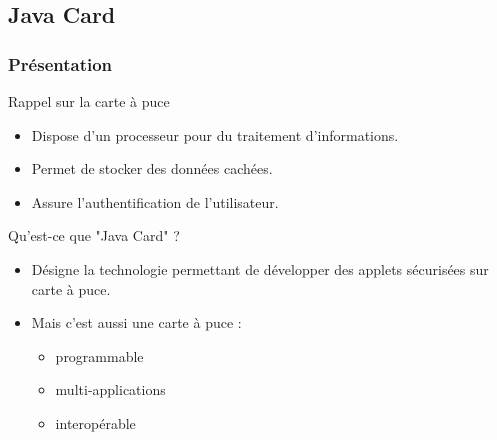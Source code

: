 \documentclass{beamer}
\begin{document}
\subsection{Java Card}
\begin{frame}
    \frametitle{Présentation}
    \begin{block}{Rappel sur la carte à puce}
        \begin{itemize}
            \item Dispose d'un processeur pour du traitement d'informations.
            \item Permet de stocker des données cachées.
            \item Assure l'authentification de l'utilisateur.
        \end{itemize}
    \end{block}
    \begin{block}{Qu'est-ce que "Java Card" ?}
        \begin{itemize}
            \item Désigne la technologie permettant de développer
                des applets \og sécurisées \fg{} sur carte à puce.

            \item Mais c'est aussi une carte à puce : 
                \begin{itemize}
                    \item programmable 
                    \item multi-applications
                    \item interopérable
                \end{itemize}
        \end{itemize}
    \end{block}
\end{frame}
\end{document}
